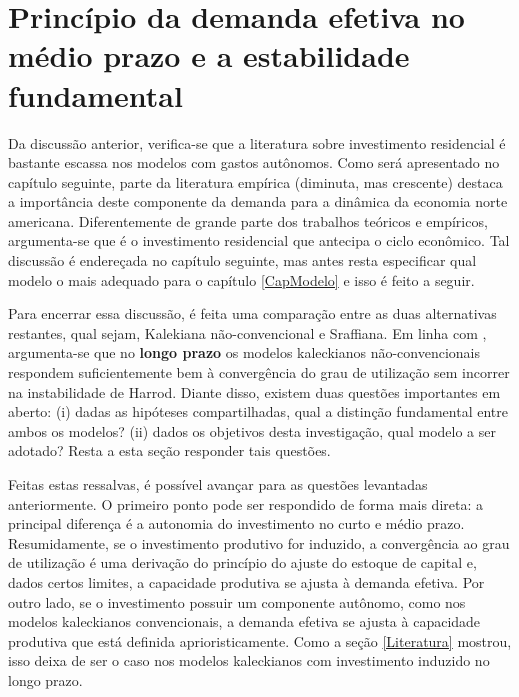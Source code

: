 \section{Princípio da demanda efetiva no médio prazo e a estabilidade fundamental}
\label{Medium}

Da discussão anterior, verifica-se que a literatura sobre investimento residencial é bastante escassa nos modelos com gastos autônomos. Como será apresentado no capítulo seguinte, parte da literatura empírica (diminuta, mas crescente) destaca a importância deste componente da demanda para a dinâmica da economia norte americana. Diferentemente de grande parte dos trabalhos teóricos e empíricos, argumenta-se que é o investimento residencial que antecipa o ciclo econômico. Tal discussão é endereçada no capítulo seguinte, mas antes resta especificar qual modelo o mais adequado para o capítulo \ref{CapModelo} e isso é feito a seguir.



Para encerrar essa discussão, é feita uma comparação entre as duas alternativas restantes, qual sejam, Kalekiana não-convencional e Sraffiana. Em linha com \textcite{fagundes_role_2017}, argumenta-se que no \textbf{longo prazo} os modelos kaleckianos não-convencionais respondem suficientemente bem à convergência do grau de utilização sem incorrer na instabilidade de Harrod. Diante disso, existem duas questões importantes em aberto: (i) dadas as hipóteses compartilhadas, qual a distinção fundamental entre ambos os modelos? (ii) dados os objetivos desta investigação, qual modelo a ser adotado? Resta a esta seção responder tais questões.


Feitas estas ressalvas, é possível avançar para as questões levantadas anteriormente.  O primeiro ponto pode ser respondido de forma mais direta: a principal diferença é a autonomia do investimento no curto e médio prazo.  Resumidamente, se o investimento produtivo for induzido, a convergência ao grau de utilização é uma derivação do princípio do ajuste do estoque de capital e, dados certos limites, a capacidade produtiva se ajusta à demanda efetiva. Por outro lado, se o investimento possuir um componente autônomo, como nos modelos kaleckianos convencionais, a demanda efetiva se ajusta à capacidade produtiva que está definida aprioristicamente. Como a seção \ref{Literatura} mostrou, isso deixa de ser o caso nos modelos kaleckianos com investimento induzido no longo prazo.

